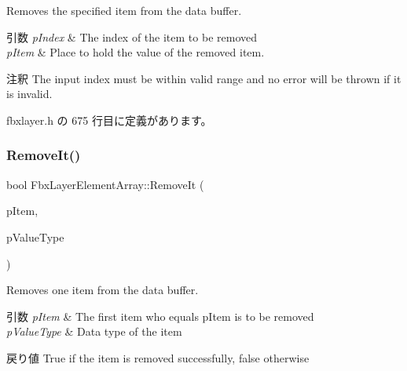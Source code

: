 Removes the specified item from the data buffer. 
\begin{DoxyParams}{引数}
{\em p\+Index} & The index of the item to be removed \\
\hline
{\em p\+Item} & Place to hold the value of the removed item. \\
\hline
\end{DoxyParams}
\begin{DoxyRemark}{注釈}
The input index must be within valid range and no error will be thrown if it is invalid. 
\end{DoxyRemark}


 fbxlayer.\+h の 675 行目に定義があります。

\mbox{\label{class_fbx_layer_element_array_a759b4eac1b85286b6eae39b588eb74ad}} 
\subsubsection{\texorpdfstring{Remove\+It()}{RemoveIt()}\hspace{0.1cm}{\footnotesize\ttfamily [1/2]}}
{\footnotesize\ttfamily bool Fbx\+Layer\+Element\+Array\+::\+Remove\+It (\begin{DoxyParamCaption}\item[{void $\ast$$\ast$}]{p\+Item,  }\item[{\hyperlink{fbxpropertytypes_8h_a73913a5ddfb20e57c6f25e9e6784bd92}{E\+Fbx\+Type}}]{p\+Value\+Type }\end{DoxyParamCaption})}

Removes one item from the data buffer. 
\begin{DoxyParams}{引数}
{\em p\+Item} & The first item who equals p\+Item is to be removed \\
\hline
{\em p\+Value\+Type} & Data type of the item \\
\hline
\end{DoxyParams}
\begin{DoxyReturn}{戻り値}
{\ttfamily True} if the item is removed successfully, {\ttfamily false} otherwise 
\end{DoxyReturn}
\mbox{\label{class_fbx_layer_element_array_aca2bacda1beff3b7da61ed290a53cb19}} 
